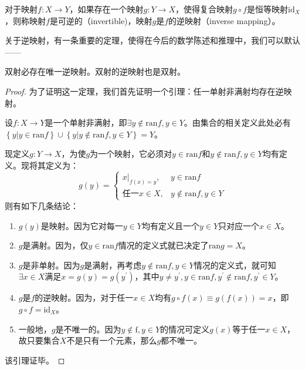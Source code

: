 \documentclass[../main.tex]{subfiles}
\begin{document}
\begin{definition}[逆映射]\label{def:II.1.14}
    对于映射$f:X\rightarrow Y$，如果存在一个映射$g:Y\rightarrow X$，使得复合映射$g\circ f$是恒等映射$\mathrm{id}_X$，则称映射$f$是可逆的（invertible)，映射$g$是$f$的逆映射（inverse mapping）。
\end{definition}

关于逆映射，有一条重要的定理，使得在今后的数学陈述和推理中，我们可以默认——
\begin{theorem}\label{thm:II.1.7}
    双射必存在唯一逆映射。双射的逆映射也是双射。
\end{theorem}
\begin{proof}
    为了证明这一定理，我们首先证明一个引理：任一单射非满射均存在逆映射。

    设$f:X\rightarrow Y$是一个单射非满射，即$\exists y\notin\mathrm{ran}f,y\in Y$。由集合的相关定义此处必有$\left\{y|y\in\mathrm{ran}f\right\}\cup\left\{y|y\notin\mathrm{ran}f,y\in Y\right\}=Y$。

    现定义$g:Y\rightarrow X$，为使$g$为一个映射，它必须对$y\in\mathrm{ran}f$和$y\notin\mathrm{ran}f,y\in Y$均有定义。现将其定义为：
    \[
        g\left(y\right)=\left\{
        \begin{array}{ll}
            \left.x\right|_{f\left(x\right)=y}, & y\in\mathrm{ran}f           \\
            \text{任一}x\in X,                    & y\notin\mathrm{ran}f,y\in Y
        \end{array}
        \right.
    \]
    则有如下几条结论：
    \begin{enumerate}
        \item $g\left(y\right)$是映射。因为它对每一$y\in Y$均有定义且一个$y\in Y$只对应一个$x\in X$。
        \item $g$是满射。因为，仅$y\in\mathrm{ran}f$情况的定义式就已决定了$\mathrm{ran}g=X$。
        \item $g$是非单射。因为$g$是满射，再考虑$y\notin\mathrm{ran}f,y\in Y$情况的定义式，就可知$\exists x\in X$满足$x=g\left(y\right)=g\left(y^\prime\right)$，其中$y\neq y^\prime,y\in\mathrm{ran}f,y^\prime\notin\mathrm{ran}f,y^\prime\in Y$。
        \item $g$是$f$的逆映射。因为，对于任一$x\in X$均有$g\circ f\left(x\right)\equiv g\left(f\left(x\right)\right)=x$，即$g\circ f=\mathrm{id}_X$。
        \item 一般地，$g$是不唯一的。因为$y\notin\mathrm{f},y\in Y$的情况可定义$g\left(x\right)$等于任一$x\in X$，故只要集合$X$不是只有一个元素，那么$g$都不唯一。
    \end{enumerate}
    该引理证毕。


\end{proof}
\end{document}
